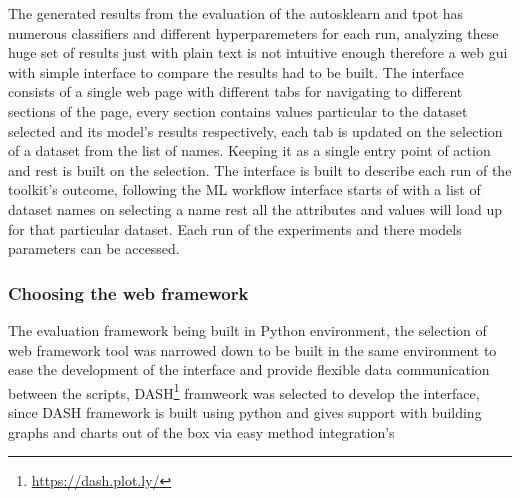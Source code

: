 The generated results from the evaluation of the autosklearn and tpot has numerous classifiers and different hyperparemeters for each run, analyzing these huge set of results just with plain text is not intuitive enough therefore a web gui with simple interface to compare the results had to be built. The interface consists of a single web page with different tabs for navigating to different sections of the page, every section contains values particular to the dataset selected and its model's results respectively, each tab is updated on the selection of a dataset from the list of names.
Keeping it as a single entry point of action and rest is built on the selection. The interface is built to describe each run of the toolkit's outcome, following the ML workflow interface starts of with a list of dataset names on selecting a name rest all the attributes and values will load up for that particular dataset. Each run of the experiments and there models parameters can be accessed.

\subsubsection{Choosing the web framework}
The evaluation framework being built in Python environment, the selection of web framework tool was narrowed down to be built in the same environment to ease the development of the interface and provide flexible data communication between the scripts, DASH\footnote{\url{https://dash.plot.ly/}} framweork was selected to develop the interface, since DASH framework is built using python and gives support with building graphs and charts out of the box via easy method integration's 
    
    
